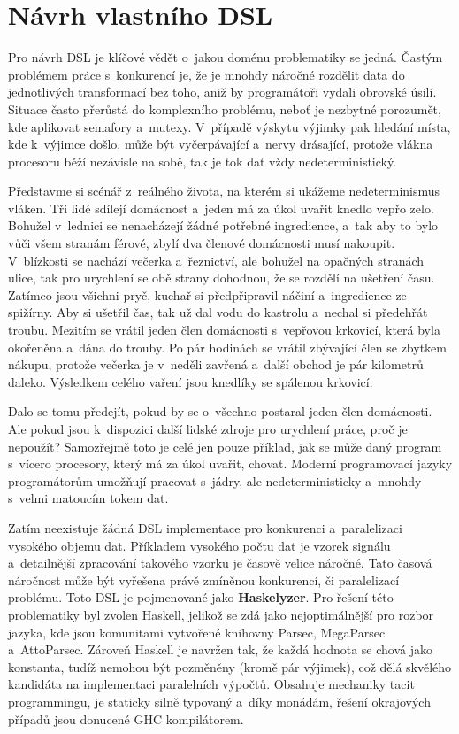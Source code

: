 \documentclass[male, czech]{kithesis}
\begin{document}
\chapter{Návrh vlastního DSL}

Pro návrh DSL je klíčové vědět o~jakou doménu problematiky se jedná.
Častým problémem práce s~konkurencí je, 
že je mnohdy náročné rozdělit data do jednotlivých transformací bez toho, 
aniž by programátoři vydali obrovské úsilí.
Situace často přerůstá do komplexního problému, 
neboť je nezbytné porozumět, 
kde aplikovat semafory a~mutexy. 
V~případě výskytu výjimky pak hledání místa, 
kde k~výjimce došlo, 
může být vyčerpávající a~nervy drásající,
protože vlákna procesoru běží nezávisle na sobě,
tak je tok dat vždy nedeterministický.

Představme si scénář z~reálného života, 
na kterém si ukážeme nedeterminismus vláken.
Tři lidé sdílejí domácnost
a~jeden má za úkol uvařit knedlo vepřo zelo.
Bohužel v~lednici se nenacházejí žádné potřebné ingredience,
a~tak aby to bylo vůči všem stranám férové,
zbylí dva členové domácnosti musí nakoupit.
V~blízkosti se nachází večerka a~řeznictví, 
ale bohužel na opačných stranách ulice, 
tak pro urychlení se obě strany dohodnou, 
že se rozdělí na ušetření času.
Zatímco jsou všichni pryč,
kuchař si předpřipravil náčiní a~ingredience ze spižírny.
Aby si ušetřil čas, 
tak už dal vodu do kastrolu a~nechal si předehřát troubu.
Mezitím se vrátil jeden člen domácnosti s~vepřovou krkovicí,
která byla okořeněna a~dána do trouby.
Po pár hodinách se vrátil zbývající člen se zbytkem nákupu, 
protože večerka je v~neděli zavřená
a~další obchod je pár kilometrů daleko.
Výsledkem celého vaření jsou knedlíky se spálenou krkovicí.

Dalo se tomu předejít,
pokud by se o~všechno postaral jeden člen domácnosti.
Ale pokud jsou k~dispozici další lidské zdroje pro urychlení práce,
proč je nepoužít?
Samozřejmě toto je celé jen pouze příklad,
jak se může daný program s~vícero procesory, 
který má za úkol uvařit, chovat.
Moderní programovací jazyky programátorům umožňují pracovat s~jádry,
ale nedeterministicky a~mnohdy s~velmi matoucím tokem dat. 

Zatím neexistuje žádná DSL implementace pro konkurenci
a~paralelizaci vysokého objemu dat.
Příkladem vysokého počtu dat je vzorek signálu
a~detailnější zpracování takového vzorku je časově velice náročné. 
Tato časová náročnost může být vyřešena právě zmíněnou konkurencí, 
či paralelizací problému. 
Toto DSL je pojmenované jako \textbf{Haskelyzer}.
Pro řešení této problematiky byl zvolen Haskell, 
jelikož se zdá jako nejoptimálnější pro rozbor jazyka,
kde jsou komunitami vytvořené knihovny Parsec, MegaParsec a~AttoParsec.
Zároveň Haskell je navržen tak, 
že každá hodnota se chová jako konstanta, 
tudíž nemohou být pozměněny (kromě pár výjimek),
což dělá skvělého kandidáta na implementaci paralelních výpočtů.
Obsahuje mechaniky tacit programmingu, 
je staticky silně typovaný a~díky monádám, 
řešení okrajových případů jsou donucené GHC kompilátorem.
\end{document}
